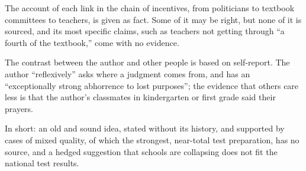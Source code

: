 \begin{afterword}
The account of each link in the chain of incentives, from politicians to textbook committees to teachers, is given as fact. Some of it may be right, but none of it is sourced, and its most specific claims, such as teachers not getting through ``a fourth of the textbook,'' come with no evidence.

The contrast between the author and other people is based on self-report. The author ``reflexively'' asks where a judgment comes from, and has an ``exceptionally strong abhorrence to lost purposes''; the evidence that others care less is that the author's classmates in kindergarten or first grade said their prayers.

In short: an old and sound idea, stated without its history, and supported by cases of mixed quality, of which the strongest, near-total test preparation, has no source, and a hedged suggestion that schools are collapsing does not fit the national test results.
\end{afterword}
